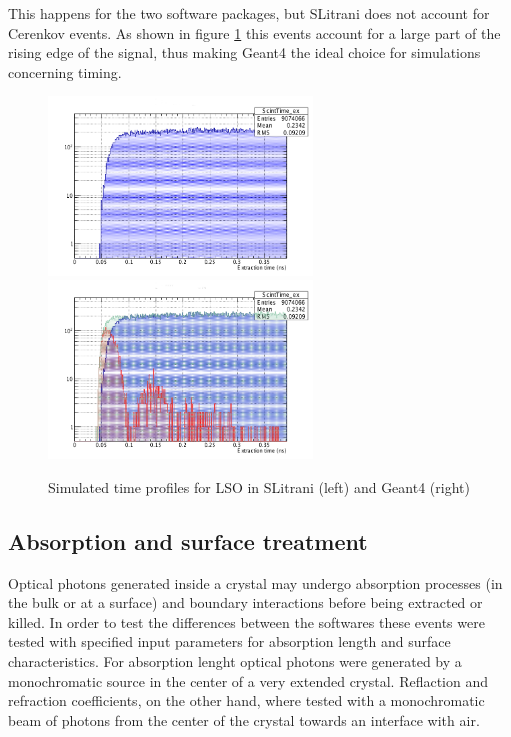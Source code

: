 This happens for the two software packages, but SLitrani does not account for Cerenkov events. As shown in figure \ref{fig:scint_cer} this events account for a large part of the rising edge of the signal, thus making Geant4 the ideal choice for simulations concerning timing.
\begin{figure}[htbp]
\begin{center}
\includegraphics[width=7cm]{../Pictures/Chapter_5/scint_time_ex.png}
\includegraphics[width=7cm]{../Pictures/Chapter_5/sum_time_ex.png}
\end{center}
\caption[Simulated time profiles for LSO]{Simulated time profiles for LSO in SLitrani (left) and Geant4 (right)}
\label{fig:scint_cer}
\end{figure}

\subsection{Absorption and surface treatment}
Optical photons generated inside a crystal may undergo absorption processes (in the bulk or at a surface) and boundary interactions before being extracted or killed.
In order to test the differences between the softwares these events were tested with specified input parameters for absorption length and surface characteristics.
For absorption lenght optical photons were generated by a monochromatic source in the center of a very extended crystal. Reflaction and refraction coefficients, on the other hand, where tested with a monochromatic beam of photons from the center of the crystal towards an interface with air.

